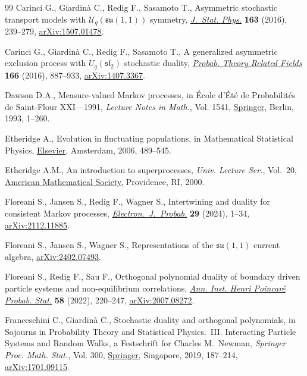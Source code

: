 \begin{thebibliography}{99}
Carinci G., Giardin\`a C., Redig F., Sasamoto T., Asymmetric stochastic
 transport models with {$\mathcal{U}_q(\mathfrak{su}(1,1))$} symmetry,
 \href{https://doi.org/10.1007/s10955-016-1473-4}{\textit{J.~Stat. Phys.}} \textbf{163} (2016), 239--279, \href{https://arxiv.org/abs/1507.01478}{arXiv:1507.01478}.

Carinci G., Giardin\`a C., Redig F., Sasamoto T., A generalized asymmetric
 exclusion process with {$U_q(\mathfrak{sl}_2)$} stochastic duality,
 \href{https://doi.org/10.1007/s00440-015-0674-0}{\textit{Probab. Theory Related Fields}} \textbf{166} (2016), 887--933,
 \href{https://arxiv.org/abs/1407.3367}{arXiv:1407.3367}.

Dawson D.A., Measure-valued {M}arkov processes, in \'Ecole d'\'Et\'e de
 {P}robabilit\'es de {S}aint-{F}lour {XXI}---1991, \textit{Lecture Notes in
 Math.}, Vol. 1541, \href{https://doi.org/10.1007/BFb0084190}{Springer}, Berlin, 1993, 1--260.

Etheridge A., Evolution in fluctuating populations, in Mathematical Statistical
 Physics, \href{https://doi.org/10.1016/S0924-8099(06)80048-X}{Elsevier}, Amsterdam, 2006, 489--545.

Etheridge A.M., An introduction to superprocesses, \textit{Univ. Lecture Ser.},
 Vol.~20, \href{https://doi.org/10.1090/ulect/020}{American Mathematical Society}, Providence, RI, 2000.

Floreani S., Jansen S., Redig F., Wagner S., Intertwining and duality for
 consistent {M}arkov processes, \href{https://doi.org/10.1214/24-ejp1124}{\textit{Electron.~J.~Probab.}} \textbf{29}
 (2024), 1--34, \href{https://arxiv.org/abs/2112.11885}{arXiv:2112.11885}.

Floreani S., Jansen S., Wagner S., Representations of the $\mathfrak{su}(1,1)$
 current algebra, \href{https://arxiv.org/abs/2402.07493}{arXiv:2402.07493}.

Floreani S., Redig F., Sau F., Orthogonal polynomial duality of boundary driven
 particle systems and non-equilibrium correlations, \href{https://doi.org/10.1214/21-aihp1163}{\textit{Ann. Inst. Henri
 Poincar\'e Probab. Stat.}} \textbf{58} (2022), 220--247, \href{https://arxiv.org/abs/2007.08272}{arXiv:2007.08272}.

Franceschini C., Giardin\`a C., Stochastic duality and orthogonal polynomials,
 in Sojourns in Probability Theory and Statistical Physics.~{III}.
 {I}nteracting Particle Systems and Random Walks, a {F}estschrift for
 {C}harles {M}.~{N}ewman, \textit{Springer Proc. Math. Stat.}, Vol. 300,
 \href{https://doi.org/10.1007/978-981-15-0302-3_7}{Springer}, Singapore, 2019, 187--214, \href{https://arxiv.org/abs/1701.09115}{arXiv:1701.09115}.


\end{thebibliography}
